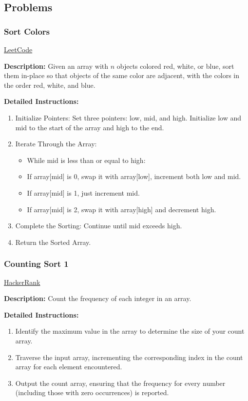 \subsection{Problems}

\subsubsection{Sort Colors}
\href{https://leetcode.com/problems/sort-colors/description/}{LeetCode}

\textbf{Description:} Given an array with $n$ objects colored red, white, or blue, sort them in-place so that objects of the same color are adjacent, with the colors in the order red, white, and blue.

\textbf{Detailed Instructions:}
\begin{enumerate}
    \item Initialize Pointers: Set three pointers: low, mid, and high. Initialize low and mid to the start of the array and high to the end.
    \item Iterate Through the Array:
    \begin{itemize}
        \item While mid is less than or equal to high:
        \item If array[mid] is 0, swap it with array[low], increment both low and mid.
        \item If array[mid] is 1, just increment mid.
        \item If array[mid] is 2, swap it with array[high] and decrement high.
    \end{itemize}
    \item Complete the Sorting: Continue until mid exceeds high.
    \item Return the Sorted Array.
\end{enumerate}

\subsubsection{Counting Sort 1}
\href{https://www.hackerrank.com/challenges/one-week-preparation-kit-countingsort1/problem}{HackerRank}

\textbf{Description:} Count the frequency of each integer in an array.

\textbf{Detailed Instructions:}
\begin{enumerate}
    \item Identify the maximum value in the array to determine the size of your count array.
    \item Traverse the input array, incrementing the corresponding index in the count array for each element encountered.
    \item Output the count array, ensuring that the frequency for every number (including those with zero occurrences) is reported.
\end{enumerate}

